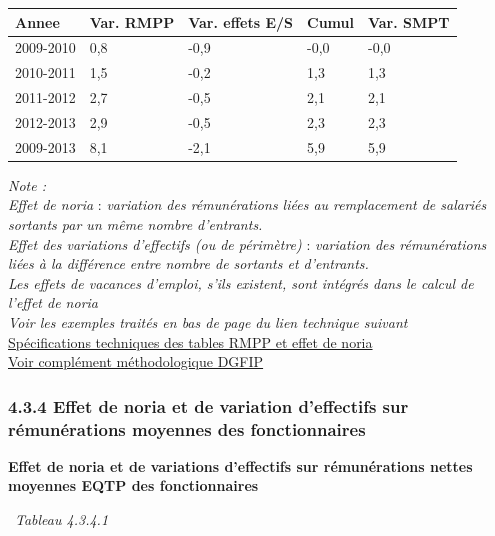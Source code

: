 \begin{longtable}[]{@{}lllll@{}}
\toprule
Annee & Var. RMPP & Var. effets E/S & Cumul & Var. SMPT\tabularnewline
\midrule
\endhead
2009-2010 & 0,8 & -0,9 & -0,0 & -0,0\tabularnewline
2010-2011 & 1,5 & -0,2 & 1,3 & 1,3\tabularnewline
2011-2012 & 2,7 & -0,5 & 2,1 & 2,1\tabularnewline
2012-2013 & 2,9 & -0,5 & 2,3 & 2,3\tabularnewline
2009-2013 & 8,1 & -2,1 & 5,9 & 5,9\tabularnewline
\bottomrule
\end{longtable}

\emph{Note :}\\
\emph{Effet de noria} : \emph{variation des rémunérations liées au
remplacement de salariés sortants par un même nombre d'entrants.}\\
\emph{Effet des variations d'effectifs (ou de périmètre)} :
\emph{variation des rémunérations liées à la différence entre nombre de
sortants et d'entrants.}\\
\emph{Les effets de vacances d'emploi, s'ils existent, sont intégrés
dans le calcul de l'effet de noria}\\
\emph{Voir les exemples traités en bas de page du lien technique
suivant}\\
\href{../Docs/Notices/noria.html}{Spécifications techniques des tables RMPP
et effet de noria}\\
\href{../Docs/Notices/GVT\%20et\%20noria.pdf}{Voir complément
méthodologique DGFIP}

\hypertarget{effet-de-noria-et-de-variation-deffectifs-sur-remunerations-moyennes-des-fonctionnaires}{%
\subsubsection{4.3.4 Effet de noria et de variation d'effectifs sur
rémunérations moyennes des
fonctionnaires}\label{effet-de-noria-et-de-variation-deffectifs-sur-remunerations-moyennes-des-fonctionnaires}}

\textbf{Effet de noria et de variations d'effectifs sur rémunérations
nettes moyennes EQTP des fonctionnaires}

~\emph{Tableau 4.3.4.1}

